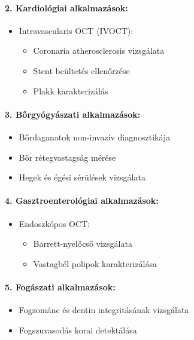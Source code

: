 \documentclass[a4paper,12pt]{article}
\begin{document}
\paragraph{2. Kardiológiai alkalmazások:} \begin{itemize} \item Intravascularis OCT (IVOCT): \begin{itemize} \item Coronaria atherosclerosis vizsgálata \item Stent beültetés ellenőrzése \item Plakk karakterizálás \end{itemize} \end{itemize}

\paragraph{3. Bőrgyógyászati alkalmazások:} \begin{itemize} \item Bőrdaganatok non-invazív diagnosztikája \item Bőr rétegvastagság mérése \item Hegek és égési sérülések vizsgálata \end{itemize}

\paragraph{4. Gasztroenterológiai alkalmazások:} \begin{itemize} \item Endoszkópos OCT: \begin{itemize} \item Barrett-nyelőcső vizsgálata \item Vastagbél polipok karakterizálása \end{itemize} \end{itemize}

\paragraph{5. Fogászati alkalmazások:} \begin{itemize} \item Fogzománc és dentin integritásának vizsgálata \item Fogszuvasodás korai detektálása \end{itemize}
\end{document}
